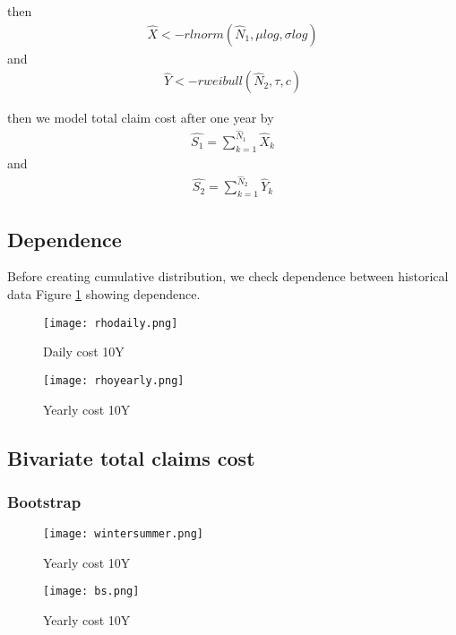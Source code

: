 \documentclass[11pt]{article}
\begin{document}
then
\begin{align*} 
	\hat{X} <- rlnorm(\hat{N}_1,\mu log,\sigma log) 
\end{align*}
and
\begin{align*} 
	 \hat{Y} <- rweibull(\hat{N}_2,\tau,c)
\end{align*}


then we model total claim cost after one year by
\begin{align} \label{eq:sum1}
	\hat{S_1} = \sum_{k=1}^{\hat{N}_1} \hat{ X}_k   
\end{align}
and
\begin{align} \label{eq:sum2}
	 \hat{S_2} = \sum_{k=1}^{\hat{N}_2} \hat{Y}_k
\end{align}


\subsection*{Dependence}
Before creating cumulative distribution, we check dependence between historical data
 Figure \ref{fig:samplefig4} showing dependence.


 \begin{figure}[H]
 \center
  \texttt{[image: rhodaily.png]}
  \caption{Daily cost 10Y}
  \label{fig:samplefig4}
\end{figure}

 \begin{figure}[H]
 \center
  \texttt{[image: rhoyearly.png]}
  \caption{Yearly cost 10Y}
  \label{fig:samplefig10y}
\end{figure}



\subsection*{Bivariate total claims cost}

\subsubsection*{Bootstrap}


 \begin{figure}[H]
 \center
  \texttt{[image: wintersummer.png]}
  \caption{Yearly cost 10Y}
  \label{fig:season}
\end{figure}

 \begin{figure}[H]
 \center
  \texttt{[image: bs.png]}
  \caption{Yearly cost 10Y}
  \label{fig:season}
\end{figure}
\end{document}
